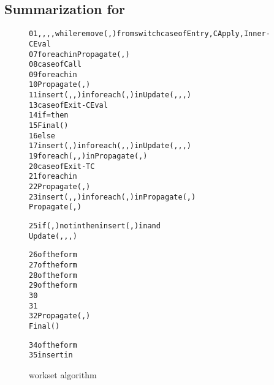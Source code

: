 \documentclass{LMCS}
\theoremstyle{definition} \newtheorem{property}[thm]{Property}
\begin{document}
\subsection{Summarization for \cfat \label{subsec:summarization}}

\begin{figure}[!t]
\newcommand{\tmphack}
           {\eh{\begin{cases}
                 \tfenv_2\onemap{f}{\mset{\denot{\slp\lambda_{l_3}\slp\mbox{}u_3 \; k_3\srp \;\mcall_3\srp}}} & \instack{l_2, f} \\ 
                 \tfenv_2 & \inheap{l_2, f} \lor \islam{f} 
           \end{cases}}}
{\footnotesize
\begin{alltt}
          01    \summary, \callers, \tcallers, \finals {}    \seen, \work {}    while       remove (\lstato, \lstatw) from       switch         case \lstatw of Entry, CApply, Inner-CEval
          07          for each \lstath in \succ{\lstatw} Propagate(\lstato, \lstath)
          08        case \lstatw of Call
          09          for each \lstath in \succ{\lstatw}
          10            Propagate(\lstath, \lstath)
          11            insert (\lstato, \lstatw, \lstath) in             for each (\lstath, \lstatf) in \summary  Update(\lstato, \lstatw, \lstath, \lstatf)
          13        case \lstatw of Exit-CEval
          14          if \lstato = \linitstate then
          15            Final(\lstatw)
          16          else
          17            insert (\lstato, \lstatw) in             for each (\lstath, \lstatf, \lstato) in \callers  Update(\lstath, \lstatf, \lstato, \lstatw)
          19            for each (\lstath, \lstatf, \lstato) in \tcallers Propagate(\lstath, \lstatw)
          20        case \lstatw of Exit-TC
          21          for each \lstath in \succ{\lstatw}
          22            Propagate(\lstath, \lstath)
          23            insert (\lstato, \lstatw, \lstath) in             for each (\lstath, \lstatf) in \summary Propagate(\lstato, \lstatf)
                Propagate(\lstato, \lstatw)  \rule{0cm}{0.45cm}
          25      if (\lstato, \lstatw) not in \seen then insert (\lstato, \lstatw) in \seen and \work
                Update(\lstato, \lstatw, \lstath, \lstatf)   \rule{0cm}{0.45cm}
          26      \lstato of the form  
          27      \lstatw of the form  
          28      \lstath of the form  
          29      \lstatf of the form  
          30      \auarg \assgn  {}
          31      \tfenv \assgn  \tmphack
          32      \lstat {}      Propagate(\lstato, \lstat)  
                Final(\lstat)   \rule{0cm}{0.45cm}
          34      \lstat of the form  
          35      insert   in \finals 
\end{alltt}
}
\caption{\cfat{} workset algorithm\label{fig:workset}}
\end{figure}
\end{document}
